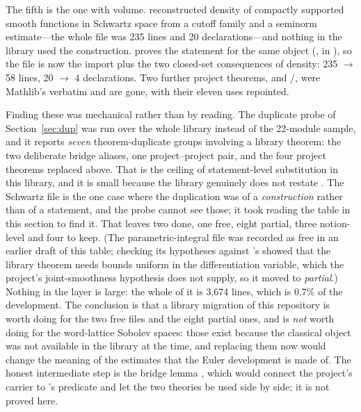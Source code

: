 The fifth is the one with volume.  reconstructed
density of compactly supported smooth functions in Schwartz space from a cutoff family and a
seminorm estimate---the whole file was 235 lines and 20 declarations---and nothing in the
library used the construction. \TauCeti{} proves the statement for the same object
(, in ), so the file
is now the import plus the two closed-set consequences of density: 235 $\to$ 58 lines,
20 $\to$ 4 declarations. Two further project theorems,  and
/, were Mathlib's  verbatim and are
gone, with their eleven uses repointed.

Finding these was mechanical rather than by reading. The duplicate probe of
Section~\ref{sec:dup} was run over the whole  library instead of the
22-module sample, and it reports \emph{seven} theorem-duplicate groups involving a library
theorem: the two deliberate \TauCeti{} bridge aliases, one project--project pair, and the
four project theorems replaced above. That is the ceiling of statement-level substitution in
this library, and it is small because the library genuinely does not restate \Mathlib{}. The
Schwartz file is the one case where the duplication was of a \emph{construction} rather than
of a statement, and the probe cannot see those; it took reading the table in this section to
find it. That leaves two done, one free, eight partial, three notion-level and four to keep. (The parametric-integral file was recorded as
free in an earlier draft of this table; checking its hypotheses against \TauCeti's showed
that the library theorem needs bounds uniform in the differentiation variable, which the
project's joint-smoothness hypothesis does not supply, so it moved to \emph{partial}.) Nothing in the layer is large: the whole of it is
3{,}674 lines, which is 0.7\% of the development. The conclusion is that a library migration
of this repository is worth doing for the two free files and the eight partial ones, and is \emph{not} worth doing for the
word-lattice Sobolev spaces: those exist because the classical object was not available in
the library at the time, and replacing them now would change the meaning of the estimates
that the Euler development is made of. The honest intermediate step is the bridge lemma
, which would connect the project's carrier to
\Mathlib's predicate and let the two theories be used side by side; it is not proved here.

